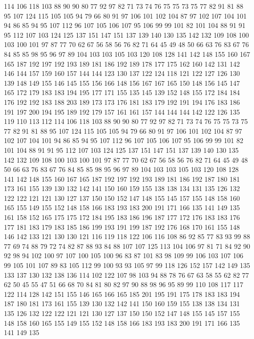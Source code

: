 114 106 118 103 88 90 90 80 77 92 97 82 71 73 74 76 75 75 73 75
77 82 91 81 88 95 107 124 115 105 105 94 79 66 80 91 97 106 101 102
104 87 97 102 107 104 101 94 86 85 94 95 107 112 96 107 105 106 107 95
106 99 99 101 82 101 104 88 91 91 95 112 107 103 124 125 137 151 147 151
137 139 140 130 135 142 132 109 108 100 103 100 101 97 87 77 70 62 67 56
58 56 76 82 71 64 45 49 48 50 66 63 76 83 67 76 84 85 85 98
95 96 97 89 104 103 103 105 103 120 108 128 141 142 148 155 160 167 165 187
192 197 192 193 189 181 186 192 189 178 177 175 162 160 142 131 142 146 144 157
159 160 157 144 144 123 130 137 122 124 118 121 122 127 126 130 139 148 149 155
146 145 155 156 166 148 156 167 167 165 150 148 156 145 147 165 172 179 183 183
194 195 177 171 155 135 145 139 152 148 155 172 184 184 176 192 192 183 188 203
189 173 173 176 181 183 179 192 191 194 176 183 186 191 197 200 194 195 189 192
179 157 161 161 157 144 144 144 142 122 126 135 119 110 113 112 114 106 118 103
88 90 90 80 77 92 97 82 71 73 74 76 75 75 73 75 77 82 91 81
88 95 107 124 115 105 105 94 79 66 80 91 97 106 101 102 104 87 97 102
107 104 101 94 86 85 94 95 107 112 96 107 105 106 107 95 106 99 99 101
82 101 104 88 91 91 95 112 107 103 124 125 137 151 147 151 137 139 140 130
135 142 132 109 108 100 103 100 101 97 87 77 70 62 67 56 58 56 76 82
71 64 45 49 48 50 66 63 76 83 67 76 84 85 85 98 95 96 97 89
104 103 103 105 103 120 108 128 141 142 148 155 160 167 165 187 192 197 192 193
189 181 186 192 187 180 181 173 161 155 139 130 132 142 141 150 160 159 155 138
138 134 131 135 126 132 122 122 121 121 130 127 137 150 150 152 147 148 155 145
157 155 148 158 160 165 155 149 155 152 148 158 166 183 193 183 200 191 171 166
135 141 149 135 161 158 152 165 175 175 172 184 195 183 186 196 187 177 172 176
183 183 176 177 181 183 179 183 185 186 199 193 191 199 187 192 176 168 170 161
155 148 146 142 133 121 130 130 121 116 119 118 122 106 116 108 86 92 85 77
83 93 99 88 77 69 74 88 79 72 74 82 87 88 93 84 88 107 107 125
113 104 106 97 81 71 84 92 90 92 98 94 102 100 97 107 100 105 100 96
83 87 101 83 98 109 99 106 103 107 106 99 105 101 107 89 83 105 112 99
100 93 93 105 97 99 118 126 152 157 142 149 135 133 137 130 132 138 136 114
102 122 107 98 103 94 88 78 76 67 63 58 55 62 82 77 62 50 45 55
47 51 66 68 70 84 81 80 82 97 90 88 98 96 95 89 99 110 108 117
117 122 114 128 142 151 155 146 165 166 165 185 201 195 191 175 178 183 183 194
187 180 181 173 161 155 139 130 132 142 141 150 160 159 155 138 138 134 131 135
126 132 122 122 121 121 130 127 137 150 150 152 147 148 155 145 157 155 148 158
160 165 155 149 155 152 148 158 166 183 193 183 200 191 171 166 135 141 149 135
